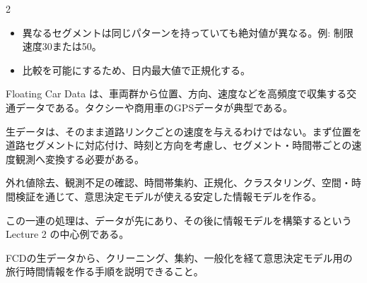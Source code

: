 \begin{multicols}{2}

\footnotesize

\raggedcolumns


\begin{itemize}
\item 異なるセグメントは同じパターンを持っていても絶対値が異なる。例: 制限速度30または50。
\item 比較を可能にするため、日内最大値で正規化する。
\end{itemize}

Floating Car Data は、車両群から位置、方向、速度などを高頻度で収集する交通データである。タクシーや商用車のGPSデータが典型である。\par

生データは、そのまま道路リンクごとの速度を与えるわけではない。まず位置を道路セグメントに対応付け、時刻と方向を考慮し、セグメント・時間帯ごとの速度観測へ変換する必要がある。\par

外れ値除去、観測不足の確認、時間帯集約、正規化、クラスタリング、空間・時間検証を通じて、意思決定モデルが使える安定した情報モデルを作る。\par

この一連の処理は、データが先にあり、その後に情報モデルを構築するという Lecture 2 の中心例である。\par

FCDの生データから、クリーニング、集約、一般化を経て意思決定モデル用の旅行時間情報を作る手順を説明できること。\par



\end{multicols}
